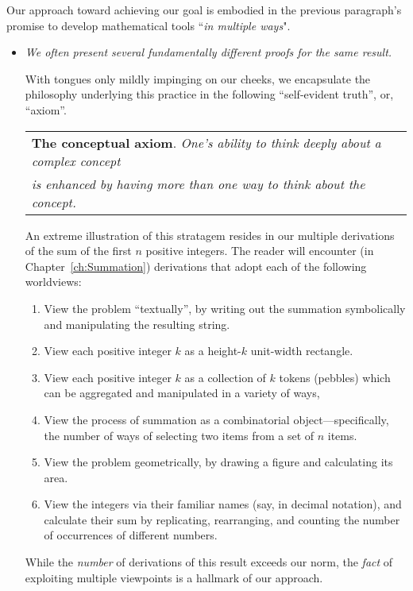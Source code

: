 Our approach toward achieving our goal is embodied in the previous paragraph's promise to develop mathematical tools ``{\em in multiple ways}".
\begin{itemize}
\item
{\em We often present several fundamentally different proofs for the same result.}

\smallskip

With tongues only mildly impinging on our cheeks, we encapsulate the philosophy underlying this practice in the following ``self-evident truth'', or, ``axiom''. 

\medskip

\hspace*{.1in}\begin{tabular}{l}
{\bf The conceptual axiom}.
{\em One's ability to think deeply about a complex concept} \\
{\em is enhanced by having more than one way to think about the concept.}
\end{tabular}

\medskip

An extreme illustration of this stratagem resides in our multiple derivations of the sum of the first $n$ positive integers.  
The reader will encounter (in Chapter~\ref{ch:Summation}) derivations that adopt each of the following worldviews:
  \begin{enumerate}
    \item
View the problem ``textually'', by writing out the summation symbolically and manipulating the resulting string.
  \item
View each positive integer $k$ as a height-$k$ unit-width rectangle.
  \item
View each positive integer $k$ as a collection of $k$ tokens (pebbles) which can be aggregated and manipulated in a variety of ways,
  \item
View the process of summation as a combinatorial object---specifically, the number of ways of selecting two items from a set of $n$ items.
  \item
View the problem geometrically, by drawing a figure and calculating its area.
  \item
View the integers via their familiar names (say, in decimal notation), and calculate their sum by replicating, rearranging, and counting the number of occurrences of different numbers.
  \end{enumerate}
While the {\em number} of derivations of this result exceeds our norm, the {\em fact} of exploiting multiple viewpoints is a hallmark of our approach.


\end{itemize}
